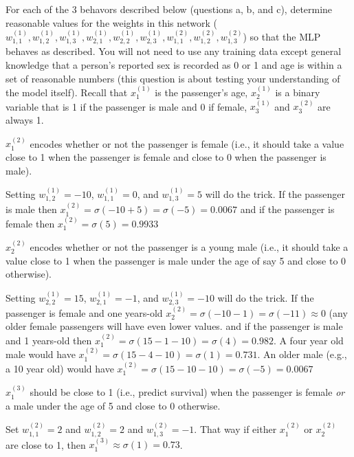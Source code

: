\documentclass[assignment06_Solutions]{subfiles}
\begin{document}
\begin{exercise}[(30 minutes)]
For each of the 3 behavors described below (questions a, b, and c), determine reasonable values for the weights in this network ($w^{(1)}_{1,1}, w^{(1)}_{1,2}, w^{(1)}_{1,3}, w^{(1)}_{2,1}, w^{(1)}_{2,2}, w^{(1)}_{2,3}, w^{(2)}_{1,1}, w^{(2)}_{1,2}, w^{(2)}_{1,3}$) so that the MLP behaves as described. You will not need to use any training data except general knowledge that a person's reported sex is recorded as 0 or 1 and age is within a set of reasonable numbers (this question is about testing your understanding of the model itself).  Recall that $x^{(1)}_1$ is the passenger's age, $x^{(1)}_2$ is a binary variable that is 1 if the passenger is male and 0 if female, $x^{(1)}_3$ and $x^{(2)}_3$ are always 1.
\bes
\item $x^{(2)}_1$ encodes whether or not the passenger is female (i.e., it should take a value close to 1 when the passenger is female and close to 0 when the passenger is male).
\begin{boxedsolution}
Setting $w^{(1)}_{1,2} = -10$, $w^{(1)}_{1,1} = 0$, and $w^{(1)}_{1,3} = 5$ will do the trick.  If the passenger is male then $x^{(2)}_1 = \sigma(-10 + 5) = \sigma(-5) = 0.0067$ and if the passenger is female then $x^{(2)}_1 = \sigma(5) = 0.9933$
\end{boxedsolution}
\item $x^{(2)}_2$ encodes whether or not the passenger is a young male (i.e., it should take a value close to 1 when the passenger is male under the age of say 5 and close to 0 otherwise).
\begin{boxedsolution}
Setting $w^{(1)}_{2,2} = 15$, $w^{(1)}_{2,1} = -1$, and $w^{(1)}_{2,3} = -10$ will do the trick.  If the passenger is female and one years-old $x^{(2)}_2 = \sigma(-10 - 1) = \sigma(-11) \approx 0$ (any older female passengers will have even lower values. and if the passenger is male and 1 years-old then $x^{(2)}_1 = \sigma(15 - 1 - 10) = \sigma(4) = 0.982$.  A four year old male would have $x^{(2)}_1 = \sigma(15 - 4 - 10) = \sigma(1) = 0.731$.  An older male (e.g., a 10 year old) would have $x^{(2)}_1 = \sigma(15 - 10 - 10) = \sigma(-5) = 0.0067$
\end{boxedsolution}
\item $x^{(3)}_1$ should be close to 1 (i.e., predict survival) when the passenger is female \emph{or} a male under the age of 5 and close to 0 otherwise.
\begin{boxedsolution}
Set $w^{(2)}_{1,1} = 2$ and $w^{(2)}_{1,2} = 2$ and $w^{(2)}_{1,3} = -1$.  That way if either $x^{(2)}_1$ or $x^{(2)}_2$ are close to 1, then $x^{(3)}_1 \approx \sigma(1) = 0.73$.
\end{boxedsolution}
\ees
\end{exercise}
\end{document}
